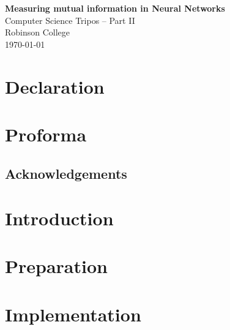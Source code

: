 \documentclass[12pt,a4paper,twoside,openright]{report}
\begin{document}





\pagestyle{empty}


\vspace*{60mm}
\begin{center}
\Huge
\textbf{Measuring mutual information in Neural Networks} \\[5mm]
Computer Science Tripos -- Part II \\[5mm]
Robinson College \\[5mm]
\today  %
\end{center}


\pagestyle{plain}

\chapter*{Declaration}


\chapter*{Proforma}


\section*{Acknowledgements}


\pagestyle{headings}

\chapter{Introduction}


\chapter{Preparation}


\chapter{Implementation}

\end{document}
